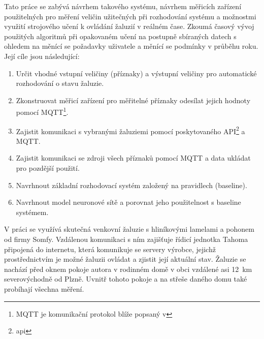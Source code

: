 Tato práce se zabývá návrhem takového systému, návrhem měřicích zařízení použitelných pro měření veličin užitečných při rozhodování systému a možnostmi využití strojového učení k ovládání žaluzií v reálném čase. Zkoumá časový vývoj použitých algoritmů při opakovaném učení na postupně sbíraných datech s ohledem na měnící se požadavky uživatele a měnící se podmínky v průběhu roku. Její cíle jsou následující:
\begin{enumerate}
    \item Určit vhodné vstupní veličiny (příznaky) a výstupní veličiny pro automatické rozhodování o stavu žaluzie.
    \item Zkonstruovat měřicí zařízení pro měřitelné příznaky odesílat jejich hodnoty pomocí MQTT\footnote{MQTT je komunikační protokol blíže popsaný v }.
    \item Zajistit komunikaci s vybranými žaluziemi pomocí poskytovaného API\footnote{\acrlong{api}} a MQTT\footnotemark[1].
    \item Zajistit komunikaci se zdroji všech příznaků pomocí MQTT a data ukládat pro pozdější použití.
    \item Navrhnout základní rozhodovací systém založený na pravidlech (baseline).
    \item Navrhnout model neuronové sítě a porovnat jeho použitelnost s baseline systémem.
\end{enumerate}

V práci se využívá skutečná venkovní žaluzie s hliníkovými lamelami a pohonem od firmy Somfy. Vzdálenou komunikaci s ním zajišťuje řídicí jednotka Tahoma připojená do internetu, která komunikuje se servery výrobce, jejichž prostřednictvím je možné žaluzii ovládat a zjistit její aktuální stav. Žaluzie se nachází před oknem pokoje autora v rodinném domě v obci vzdálené asi 12~km severovýchodně od Plzně. Uvnitř tohoto pokoje a na střeše daného domu také probíhají všechna měření.